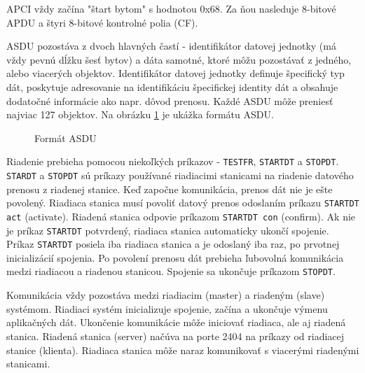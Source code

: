 \par
APCI vždy začína "štart bytom" s hodnotou 0x68. Za ňou nasleduje 8-bitové APDU a štyri 8-bitové kontrolné polia (CF). \par 
ASDU pozostáva z dvoch hlavných častí - identifikátor datovej jednotky (má vždy pevnú dĺžku šesť bytov) a dáta samotné, ktoré môžu pozostávať z jedného, alebo viacerých objektov. Identifikátor datovej jednotky definuje špecifický typ dát, poskytuje adresovanie na identifikáciu špecifickej identity dát a obsahuje dodatočné informácie ako napr. dôvod prenosu. Každé ASDU môže preniesť najviac 127 objektov. Na obrázku \ref{ASDU} je ukážka formátu ASDU\cite{iec}.
\begin{figure}[h]
    \centering
    \caption{Formát ASDU\cite{iec}}
\label{ASDU}
\end{figure}
\par
Riadenie prebieha pomocou niekoľkých príkazov - {\tt TESTFR}, {\tt STARTDT} a {\tt STOPDT}. {\tt STARDT} a {\tt STOPDT} sú príkazy používané riadiacimi stanicami na riadenie datového prenosu z riadenej stanice. Keď započne komunikácia, prenos dát nie je ešte povolený. Riadiaca stanica musí povoliť datový prenos odoslaním príkazu {\tt STARTDT act} (activate). Riadená stanica odpovie príkazom {\tt STARTDT con} (confirm). Ak nie je príkaz {\tt STARTDT} potvrdený, riadiaca stanica automaticky ukončí spojenie. Príkaz {\tt STARTDT} posiela iba riadiaca stanica a je odoslaný iba raz, po prvotnej inicializácií spojenia. Po povolení prenosu dát prebieha ľubovolná komunikácia medzi riadiacou a riadenou stanicou. Spojenie sa ukončuje príkazom {\tt STOPDT}.\par
Komunikácia vždy pozostáva medzi riadiacim (master) a riadeným (slave) systémom. Riadiaci systém inicializuje spojenie, začína a ukončuje výmenu aplikačných dát. Ukončenie komunikácie môže iniciovať riadiaca, ale aj riadená stanica. Riadená stanica (server) načúva na porte 2404 na príkazy od riadiacej stanice (klienta). Riadiaca stanica môže naraz komunikovať s viacerými riadenými stanicami\cite{iec}\cite{Pekarek}.
